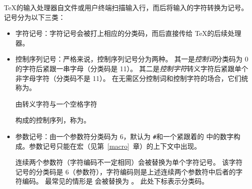 \documentclass{book}
\begin{document}
\TeX 的输入处理器自文件或用户终端扫描输入行，而后将输入的字符转换为记号。
记号分为以下三类：
\begin{itemize}
\item 字符记号：字符记号会被打上相应的分类码，而后直接传给 \TeX 的后续处理器。
\item 控制序列记号：严格来说，控制序列记号分为两种。
其一是\emph{控制词}\ldash 分类码为 0 的字符后紧跟一串字母（分类码是 11）。
其二是\emph{控制字符}\ldash 转义字符后紧跟单个非字母字符（分类码不是 11）。
在无需区分控制词和控制字符的场合，它们统称为。

由转义字符与一个空格字符 \cstoidx {}\par\cs{}\textvisiblespace 构成的控制序列，称为。
\item 参数记号：由一个参数符\ldash 分类码为 6，默认为 \verb-#-\rdash 和一个紧跟着的 中的数字构成。参数记号只能在宏（见第~\ref{macro}~章）的上下文中出现。

连续两个参数符（字符编码不一定相同）会被替换为单个字符记号。
该字符记号的分类码是 6（参数符），字符编码则是上述连续两个参数符中后者的字符编码。
最常见的情形是 \n{\#\#} 会被替换为 。
此处下标表示分类码。
\end{itemize}
\end{document}
